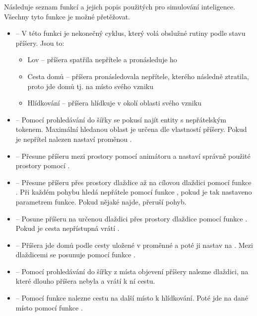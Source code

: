 Následuje seznam funkcí a jejich popis použitých pro simulování inteligence. Všechny tyto funkce je možné přetěžovat.
\begin{itemize}

\item {} -- V této funkci je nekonečný cyklus, který volá obslužné rutiny podle stavu příšery. Jsou to:
	\begin{itemize}
    \item Lov -- příšera spatřila nepřítele a pronásleduje ho 
    \item Cesta domů -- příšera pronásledovala nepřítele, kterého následně ztratila, proto jde domů tj. na místo svého vzniku
    \item Hlídkování -- příšera hlídkuje v okolí oblasti svého vzniku
	\end{itemize}

\item {} -- Pomocí prohledávání do šířky se pokusí najít entity s nepřátelským tokenem. Maximální hledanou oblast
je určena dle vlastností příšery. Pokud je nepřítel nalezen nastaví proměnou .

\item {} -- Přesune příšeru mezi prostory pomocí animátoru a nastaví správně použité prostory pomocí .

\item {} -- Přesune příšeru přes prostory dlaždice až na cílovou dlaždici pomocí funkce . Při každém pohybu hledá nepřátele
pomocí funkce , pokud je tak nastaveno parametrem funkce. Pokud nějaké najde, přeruší pohyb.

\item {} -- Posune příšeru na určenou dlaždici přes prostory dlaždice pomocí funkce .
 Pokud je cesta nepřístupná vrátí .

\item {} -- Příšera jde domů podle cesty uložené v proměnné  a poté ji nastav na . 
         Mezi dlaždicemi se posunuje pomocí funkce .

\item {} -- Pomocí prohledávání do šířky z místa objevení příšery nalezne dlaždici, na které dlouho
příšera nebyla a vrátí k ní cestu.

\item {} -- Pomocí funkce  nalezne cestu na další místo k hlídkování. Poté jde na dané místo
 pomocí funkce .


\end{itemize}
